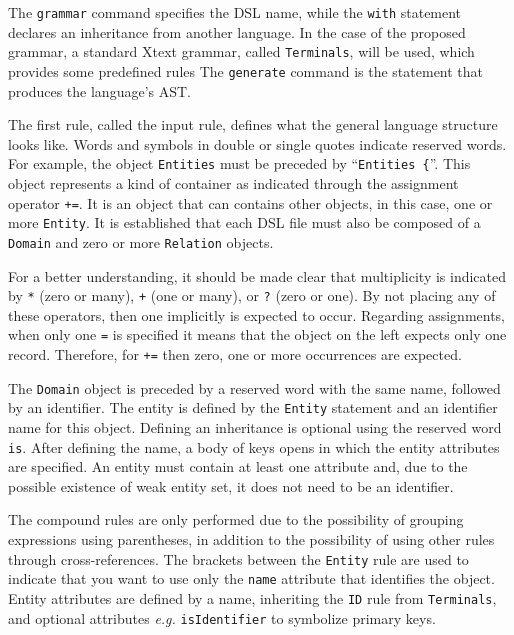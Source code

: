 \documentclass[a4paper,twoside,anonymous]{article}
\begin{document}
The \texttt{grammar} command specifies the DSL name, while the \texttt{with} statement declares an inheritance from another language.
In the case of the proposed grammar, a standard Xtext grammar, called \texttt{Terminals}, will be used, which provides some predefined rules
The \texttt{generate} command is the statement that produces the language's AST.

The first rule, called the input rule, defines what the general language structure looks like.
Words and symbols in double or single quotes indicate reserved words.
For example, the object \texttt{Entities} must be preceded by ``\texttt {Entities \{}''.
This object represents a kind of container as indicated through the assignment operator \texttt{+=}.
It is an object that can contains other objects, in this case, one or more \texttt{Entity}.
It is established that each DSL file must also be composed of a \texttt{Domain} and zero or more \texttt{Relation} objects.

For a better understanding, it should be made clear that multiplicity is indicated by \texttt{*} (zero or many), \texttt{+} (one or many), or \texttt{?} (zero or one).
By not placing any of these operators, then one implicitly is expected to occur.
Regarding assignments, when only one \texttt{=} is specified it means that the object on the left expects only one record.
Therefore, for \texttt{+=} then zero, one or more occurrences are expected.

The \texttt{Domain} object is preceded by a reserved word with the same name, followed by an identifier.
The entity is defined by the \texttt{Entity} statement and an identifier name for this object.
Defining an inheritance is optional using the reserved word \texttt{is}.
After defining the name, a body of keys opens in which the entity attributes are specified.
An entity must contain at least one attribute and, due to the possible existence of weak entity set, it does not need to be an identifier.

The compound rules are only performed due to the possibility of grouping expressions using parentheses, in addition to the possibility of using other rules through cross-references.
The brackets between the \texttt{Entity} rule are used to indicate that you want to use only the \texttt{name} attribute that identifies the object.
Entity attributes are defined by a name, inheriting the \texttt{ID} rule from \texttt{Terminals}, and optional attributes \textit{e.g.} \texttt{isIdentifier} to symbolize primary keys.
\end{document}
